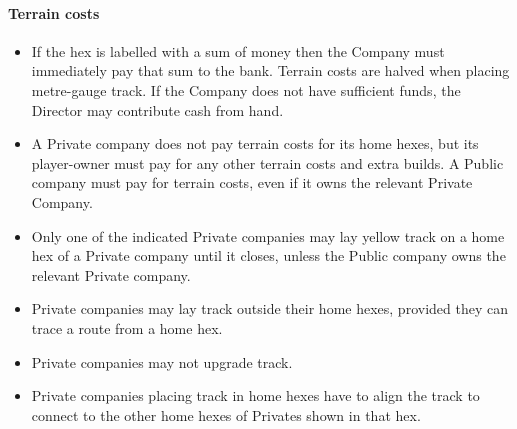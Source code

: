 \documentclass[a4paper,twocolumn]{article}
\begin{document}
\paragraph{Terrain costs}
\begin{itemize}
	\item If the hex is labelled with a sum of money then the Company must
	immediately pay that sum to the bank. Terrain costs are halved when placing
	metre-gauge track. If the Company does not have sufficient funds, the
	Director may contribute cash from hand.
	\item A Private company does not pay terrain costs for its home hexes, but
	its player-owner must pay for any other terrain costs and extra builds. A
	Public company must pay for terrain costs, even if it owns the relevant
	Private Company.
	\item Only one of the indicated Private companies may lay yellow track on a
	home hex of a Private company until it closes, unless the Public company
	owns the relevant Private company.
	\item Private companies may lay track outside their home hexes, provided
	they can trace a route from a home hex.
	\item Private companies may not upgrade track.
	\item Private companies placing track in home hexes have to align the track
	to connect to the other home hexes of Privates shown in that hex.
\end{itemize}
\end{document}
